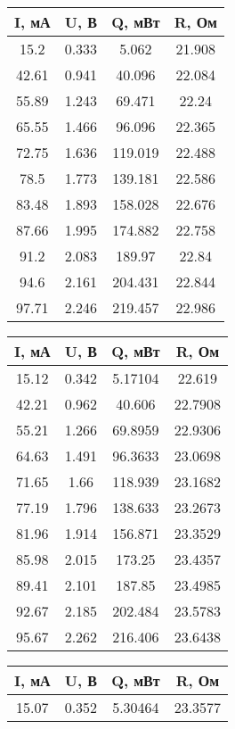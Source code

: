 \begin{table}
\begin{tabular}{|c|c|c|c|}
    \hline
    I, мА & U, В & Q, мВт & R, Ом \\
    \hline
    15.2 & 0.333 & 5.062 & 21.908 \\
    \hline
    42.61 & 0.941 & 40.096 & 22.084 \\
    \hline
    55.89 & 1.243 & 69.471 & 22.24 \\
    \hline
    65.55 & 1.466 & 96.096 & 22.365 \\
    \hline
    72.75 & 1.636 & 119.019 & 22.488 \\
    \hline
    78.5 & 1.773 & 139.181 & 22.586 \\
    \hline
    83.48 & 1.893 & 158.028 & 22.676 \\
    \hline
    87.66 & 1.995 & 174.882 & 22.758 \\
    \hline
    91.2 & 2.083 & 189.97 & 22.84 \\
    \hline
    94.6 & 2.161 & 204.431 & 22.844 \\
    \hline
    97.71 & 2.246 & 219.457 & 22.986 \\
    \hline
    \end{tabular}
\hfill
\begin{tabular}{|c|c|c|c|}
    \hline
    I, мА & U, В & Q, мВт & R, Ом \\
    \hline
    15.12 & 0.342 & 5.17104 & 22.619 \\
    \hline
    42.21 & 0.962 & 40.606 & 22.7908 \\
    \hline
    55.21 & 1.266 & 69.8959 & 22.9306 \\
    \hline
    64.63 & 1.491 & 96.3633 & 23.0698 \\
    \hline
    71.65 & 1.66 & 118.939 & 23.1682 \\
    \hline
    77.19 & 1.796 & 138.633 & 23.2673 \\
    \hline
    81.96 & 1.914 & 156.871 & 23.3529 \\
    \hline
    85.98 & 2.015 & 173.25 & 23.4357 \\
    \hline
    89.41 & 2.101 & 187.85 & 23.4985 \\
    \hline
    92.67 & 2.185 & 202.484 & 23.5783 \\
    \hline
    95.67 & 2.262 & 216.406 & 23.6438 \\
    \hline
\end{tabular}
\hfill
    \begin{tabular}{|c|c|c|c|}
    \hline
    I, мА & U, В & Q, мВт & R, Ом \\
    \hline
    15.07 & 0.352 & 5.30464 & 23.3577 \\

\end{tabular}
\end{table}
